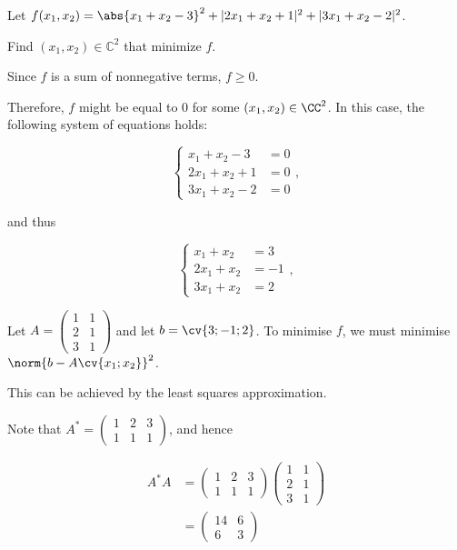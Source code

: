 \documentclass[11pt]{scrartcl}
\begin{document}
Let $f(x_1,x_2) = \abs{x_1 + x_2-3}^2 + |2x_1 + x_2+1|^2 + |3x_1 + x_2-2|^2$.

\begin{problem*}
  \hfill
  
Find $(x_1, x_2) \in \mathbb C^2$ that minimize $f$.
\end{problem*}

\begin{soln}
  \hfill

  Since $f$ is a sum of nonnegative terms, $f \geq 0$.

  Therefore, $f$ might be equal to $0$ for some $(x_1,
  x_2)\in\CC^2$. In this case, the following system of equations
  holds:
  
  \begin{equation}
    \begin{cases}
      x_1 + x_2-3 &= 0 \\
      2x_1 + x_2+1 &= 0\\
      3x_1 + x_2-2 &= 0
    \end{cases},
  \end{equation}

  and thus

    \begin{equation}
    \begin{cases}
      x_1 + x_2 &= 3 \\
      2x_1 + x_2 &= -1\\
      3x_1 + x_2 &= 2
    \end{cases},
  \end{equation}

  Let $A = 
  \begin{pmatrix}
    1 & 1\\
    2 & 1\\
    3 & 1
  \end{pmatrix}$ and let $b = \cv{3;-1;2}$. To minimise $f$, we must
  minimise $\norm{b - A\cv{x_1;x_2}}^2$.

  This can be achieved by the least squares approximation.
  
  Note that $A^{*} = 
  \begin{pmatrix}
    1 & 2 & 3 \\
    1 & 1 & 1
  \end{pmatrix}
  $, and hence

  \begin{align}
    A^{*}A &=
    \begin{pmatrix}
    1 & 2 & 3 \\
    1 & 1 & 1
  \end{pmatrix}
   \begin{pmatrix}
    1 & 1\\
    2 & 1\\
    3 & 1
  \end{pmatrix}\\
    &=\begin{pmatrix}
      14 & 6\\
      6 & 3
    \end{pmatrix}
  \end{align}


\end{soln}
\end{document}
